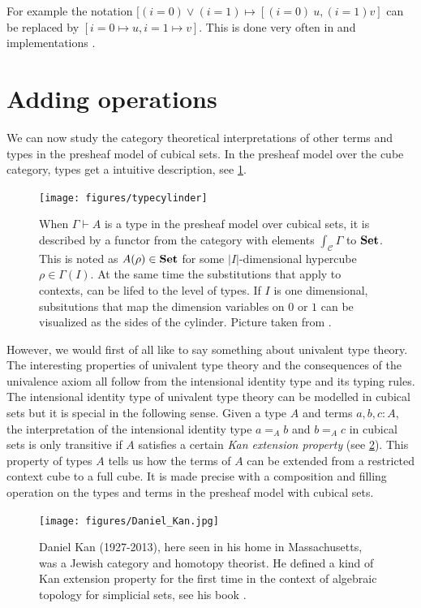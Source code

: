 \documentclass[11pt,a4paper,twoside,xetex,draft]{book}
\newcommand{\keyword}[1]{\emph{#1}\index{#1}}
\begin{document}
For example the notation $[(i = 0) \vee (i=1) \mapsto [(i=0) \ u, (i=1) v]$ can be replaced by $[i=0 \mapsto u, i=1 \mapsto v]$. This is done very often in \cite{Huber2016} and implementations \cite{Moertberg2018}.

\section{Adding operations}\label{extraops}

We can now study the category theoretical interpretations of other terms and types in the presheaf model of cubical sets. In the presheaf model over the cube category, types get a intuitive description, see \cref{hubtypes}. 

\begin{figure}\label{hubtypes}
 \centering
 
 \texttt{[image: figures/typecylinder]}
 
 \caption{When $\Gamma \vdash A$ is a type in the presheaf model over cubical sets, it is described by a functor from the category with elements $\int_{\mathcal{C}} \Gamma$ to $\text{\textbf{Set}}$. 
 This is noted as $A(\rho) \in \text{\textbf{Set}}$ for some $|I|$-dimensional hypercube $\rho \in \Gamma (I)$. At the same time the substitutions that apply to contexts, can be lifed to the level of types. If $I$ is one dimensional, subsitutions that map the dimension variables on $0$ or $1$ can be visualized as the sides of the cylinder. Picture taken from \cite{Huber2016def}.}
\end{figure}


However, we would first of all like to say something about univalent type theory. The interesting properties of univalent type theory and the consequences of the univalence axiom all follow from the intensional identity type and its typing rules. The intensional identity type of univalent type theory can be modelled in cubical sets but it is special in the following sense. Given a type $A$ and terms $a,b,c:A$, the interpretation of the intensional identity type $a =_A b$ and $b=_A c$  in cubical sets is only transitive if $A$ satisfies a certain \keyword{Kan extension property} (see \cref{fig:Kan}). This property of types $A$ tells us how the terms of $A$ can be extended from a restricted context cube to a full cube. It is made precise with a composition and filling operation on the types and terms in the presheaf model with cubical sets.

\begin{figure}
\begin{centering}
\texttt{[image: figures/Daniel\_Kan.jpg]}
\par\end{centering}
\caption{\label{fig:Kan}Daniel Kan (1927-2013), here seen in his home in Massachusetts, was a Jewish category and homotopy theorist. He defined  a kind of Kan extension property for the first time in the context of algebraic topology for simplicial sets, see his book \cite{Kan1955}.}
\end{figure}
\end{document}
